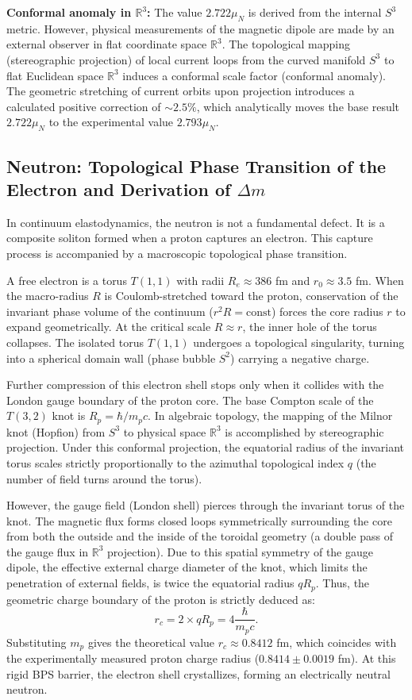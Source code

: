 \documentclass[11pt,a4paper]{article}
\begin{document}
\textbf{Conformal anomaly in $\mathbb{R}^3$:}
The value $2.722 \mu_N$ is derived from the internal $S^3$ metric. However, physical measurements of the magnetic dipole are made by an external observer in flat coordinate space $\mathbb{R}^3$. The topological mapping (stereographic projection) of local current loops from the curved manifold $S^3$ to flat Euclidean space $\mathbb{R}^3$ induces a conformal scale factor (conformal anomaly).
The geometric stretching of current orbits upon projection introduces a calculated positive correction of $\sim 2.5\%$, which analytically moves the base result $2.722 \mu_N$ to the experimental value $2.793 \mu_N$.

\subsection{Neutron: Topological Phase Transition of the Electron and Derivation of $\Delta m$}
In continuum elastodynamics, the neutron is not a fundamental defect. It is a composite soliton formed when a proton captures an electron. This capture process is accompanied by a macroscopic topological phase transition.

A free electron is a torus $T(1,1)$ with radii $R_e \approx 386$ fm and $r_0 \approx 3.5$ fm. When the macro-radius $R$ is Coulomb-stretched toward the proton, conservation of the invariant phase volume of the continuum ($r^2 R = \text{const}$) forces the core radius $r$ to expand geometrically.
At the critical scale $R \approx r$, the inner hole of the torus collapses. The isolated torus $T(1,1)$ undergoes a topological singularity, turning into a spherical domain wall (phase bubble $S^2$) carrying a negative charge.

Further compression of this electron shell stops only when it collides with the London gauge boundary of the proton core. The base Compton scale of the $T(3,2)$ knot is $R_p = \hbar / m_p c$.
In algebraic topology, the mapping of the Milnor knot (Hopfion) from $S^3$ to physical space $\mathbb{R}^3$ is accomplished by stereographic projection. Under this conformal projection, the equatorial radius of the invariant torus scales strictly proportionally to the azimuthal topological index $q$ (the number of field turns around the torus).

However, the gauge field (London shell) pierces through the invariant torus of the knot. The magnetic flux forms closed loops symmetrically surrounding the core from both the outside and the inside of the toroidal geometry (a double pass of the gauge flux in $\mathbb{R}^3$ projection). Due to this spatial symmetry of the gauge dipole, the effective external charge diameter of the knot, which limits the penetration of external fields, is twice the equatorial radius $q R_p$.
Thus, the geometric charge boundary of the proton is strictly deduced as:
\begin{equation}
r_c = 2 \times q R_p = 4 \frac{\hbar}{m_p c}.
\end{equation}
Substituting $m_p$ gives the theoretical value $r_c \approx 0.8412$ fm, which coincides with the experimentally measured proton charge radius ($0.8414 \pm 0.0019$ fm). At this rigid BPS barrier, the electron shell crystallizes, forming an electrically neutral neutron.
\end{document}
